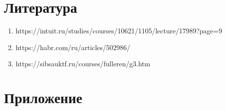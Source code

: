 \documentclass[14pt, russian]{extarticle}
\begin{document}
	\newpage
	
	\section{Литература}
	\begin{enumerate}
		\item https://intuit.ru/studies/courses/10621/1105/lecture/17989?page=9
		\item https://habr.com/ru/articles/502986/
		\item https://sibsauktf.ru/courses/fulleren/g3.htm
	\end{enumerate}
	\newpage
	
	\section{Приложение}
\end{document}

